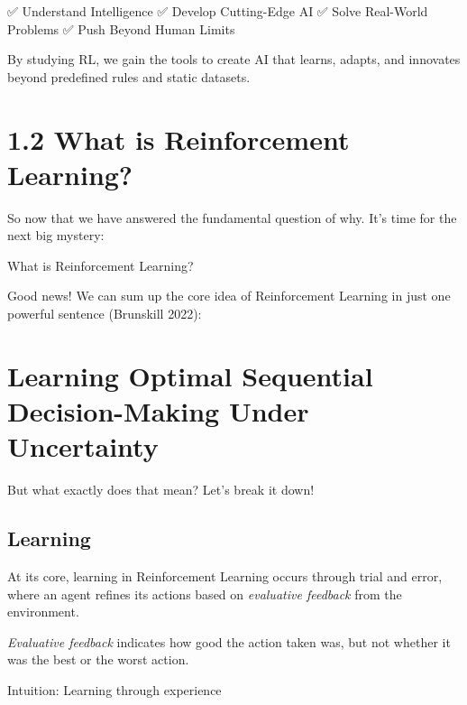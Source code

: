 \documentclass[
  letterpaper,
  DIV=11,
  numbers=noendperiod]{scrreprt}
\begin{document}
✅ Understand Intelligence ✅ Develop Cutting-Edge AI ✅ Solve
Real-World Problems ✅ Push Beyond Human Limits

By studying RL, we gain the tools to create AI that learns, adapts, and
innovates beyond predefined rules and static datasets. 🚀

\chapter{1.2 What is Reinforcement
Learning?}\label{what-is-reinforcement-learning}

\begin{tcolorbox}[enhanced jigsaw, colback=white, left=2mm, breakable, opacityback=0, bottomrule=.15mm, rightrule=.15mm, arc=.35mm, colframe=quarto-callout-note-color-frame, leftrule=.75mm, toprule=.15mm]

So now that we have answered the fundamental question of why. It's time
for the next big mystery:

What is Reinforcement Learning? 🤔

\end{tcolorbox}

Good news! We can sum up the core idea of Reinforcement Learning in just
one powerful sentence (Brunskill 2022):

\chapter{Learning Optimal Sequential Decision-Making Under
Uncertainty}\label{learning-optimal-sequential-decision-making-under-uncertainty}

But what exactly does that mean? Let's break it down!

\section{Learning}\label{learning}

At its core, learning in Reinforcement Learning occurs through trial and
error, where an agent refines its actions based on \emph{evaluative
feedback} from the environment.

\begin{tcolorbox}[enhanced jigsaw, opacityback=0, left=2mm, breakable, bottomtitle=1mm, rightrule=.15mm, colframe=quarto-callout-tip-color-frame, titlerule=0mm, colback=white, opacitybacktitle=0.6, toptitle=1mm, title=\textcolor{quarto-callout-tip-color}{\faLightbulb}\hspace{0.5em}{Evaluative Feedback}, colbacktitle=quarto-callout-tip-color!10!white, bottomrule=.15mm, arc=.35mm, coltitle=black, leftrule=.75mm, toprule=.15mm]

\emph{Evaluative feedback} indicates how good the action taken was, but
not whether it was the best or the worst action.

Intuition: Learning through experience

\end{tcolorbox}
\end{document}
